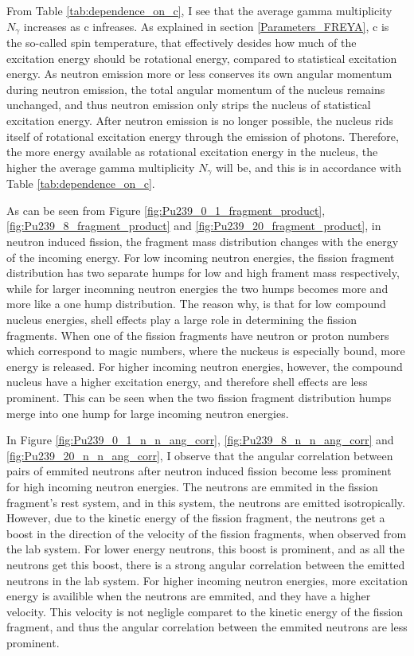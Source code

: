 \documentclass[]{article}
\begin{document}
From Table \ref{tab:dependence_on_c}, I see that the average gamma multiplicity $N_{\gamma}$ increases as c infreases. As explained in section \ref{Parameters_FREYA}, c is the so-called spin temperature, that effectively desides how much of the excitation energy should be rotational energy, compared to statistical excitation energy. As neutron emission more or less conserves its own angular momentum during neutron emission, the total angular momentum of the nucleus remains unchanged, and thus neutron emission only strips the nucleus of statistical excitation energy. After neutron emission is no longer possible, the nucleus rids itself of rotational excitation energy through the emission of photons. Therefore, the more energy available as rotational excitation energy in the nucleus, the higher the average gamma multiplicity $N_{\gamma}$ will be, and this is in accordance with Table \ref{tab:dependence_on_c}.
\par 
\vspace{3mm}

As can be seen from Figure \ref{fig:Pu239_0_1_fragment_product}, \ref{fig:Pu239_8_fragment_product} and \ref{fig:Pu239_20_fragment_product}, in neutron induced fission, the fragment mass distribution changes with the energy of the incoming energy. For low incoming neutron energies, the fission fragment distribution has two separate humps for low and high frament mass respectively, while for larger incomning neutron energies the two humps becomes more and more like a one hump distribution. The reason why, is that for low compound nucleus energies, shell effects play a large role in determining the fission fragments. When one of the fission fragments have neutron or proton numbers which correspond to magic numbers, where the nuckeus is especially bound, more energy is released. For higher incoming neutron energies, however, the compound nucleus have a higher excitation energy, and therefore shell effects are less prominent. This can be seen when the two fission fragment distribution humps merge into one hump for large incoming neutron energies.\par 
\vspace{3mm}

In Figure \ref{fig:Pu239_0_1_n_n_ang_corr}, \ref{fig:Pu239_8_n_n_ang_corr} and \ref{fig:Pu239_20_n_n_ang_corr}, I observe that the angular correlation between pairs of emmited neutrons after neutron induced fission become less prominent for high incoming neutron energies. The neutrons are emmited in the fission fragment's rest system, and in this system, the neutrons are emitted isotropically. However, due to the kinetic energy of the fission fragment, the neutrons get a boost in the direction of the velocity of the fission fragments, when observed from the lab system. For lower energy neutrons, this boost is prominent, and as all the neutrons get this boost, there is a strong angular correlation between the emitted neutrons in the lab system. For higher incoming neutron energies, more excitation energy is availible when the neutrons are emmited, and they have a higher velocity. This velocity is not negligle comparet to the kinetic energy of the fission fragment, and thus the angular correlation between the emmited neutrons are less prominent.
\end{document}
